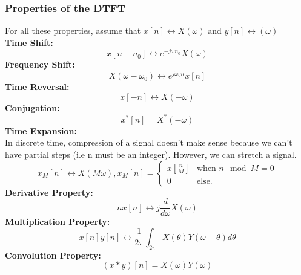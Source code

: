 \subsubsection{Properties of the DTFT}
For all these properties, assume that $x[n] \leftrightarrow X(\omega)$ and $y[n]\leftrightarrow (\omega)$\\
\textbf{Time Shift: }
\[
 x[n-n_0] \leftrightarrow e^{-j\omega n_0}X(\omega)
\]
\textbf{Frequency Shift: }
\[
 X(\omega - \omega_0) \leftrightarrow e^{j\omega_0 n}x[n]
\]
\textbf{Time Reversal: }
\[
 x[-n] \leftrightarrow X(-\omega)
\]
\textbf{Conjugation: }
\[
 x^*[n] = X^*(-\omega)
\]
\textbf{Time Expansion: }\\
In discrete time, compression of a signal doesn't make sense because we can't have partial steps (i.e n must be an integer).
However, we can stretch a signal.
\[
  x_M[n] \leftrightarrow X(M\omega), x_M[n] = \begin{cases}
	x\left[\frac{n}{M}\right] & \text{when } n \mod M = 0\\
	0 & \text{else.}
\end{cases}
\]
\textbf{Derivative Property: }
\[
nx[n] \leftrightarrow j \frac{d}{d\omega}X(\omega)
\]
\textbf{Multiplication Property: }
\[
 x[n]y[n] \leftrightarrow \frac{1}{2\pi}\int_{2\pi}{X(\theta)Y(\omega-\theta)d\theta}
\]
\textbf{Convolution Property: }
\[
(x*y)[n] = X(\omega)Y(\omega)
\]
